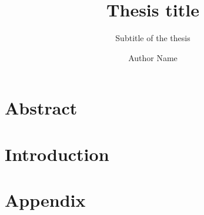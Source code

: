\documentclass[
  a4paper,            %
  thesis=student,     %
  english,            %
]{tumbook}
\title{Thesis title}
\subtitle{Subtitle of the thesis}
\author{Author Name}
\begin{document}
\frontmatter
\maketitle
\chapter{Abstract}

\tableofcontents

\mainmatter
\chapter{Introduction}


\appendix
\chapter{Appendix}
\lipsum[4]

% 
\end{document}
